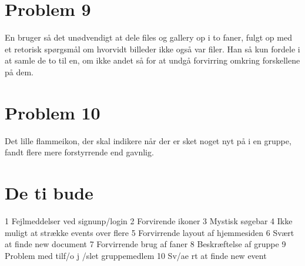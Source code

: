 \documentclass[12pt]{article}
\begin{document}
\section*{Problem 9}
En bruger så det unødvendigt at dele files og gallery op i to faner, fulgt op med et
retorisk spørgsmål om hvorvidt billeder ikke også var filer. Han så kun fordele i at
samle de to til en, om ikke andet så for at undgå forvirring omkring forskellene på
dem.
\newpage
\section*{Problem 10}
Det lille flammeikon, der skal indikere når der er sket noget nyt på i en gruppe,
fandt flere mere forstyrrende end gavnlig.

\section*{De ti bude}
 
1  Fejlmeddelser ved signunp/login
2  Forvirende ikoner
3  Mystisk s\o gebar
4  Ikke muligt at str\ae kke events over flere
5  Forvirrende layout af hjemmesiden
6  Sv\ae rt at finde new document
7  Forvirrende brug af faner
8  Beskr\ae ftelse af gruppe 
9  Problem med tilf/o j /slet gruppemedlem
10 Sv/ae rt at finde new event
\end{document}

